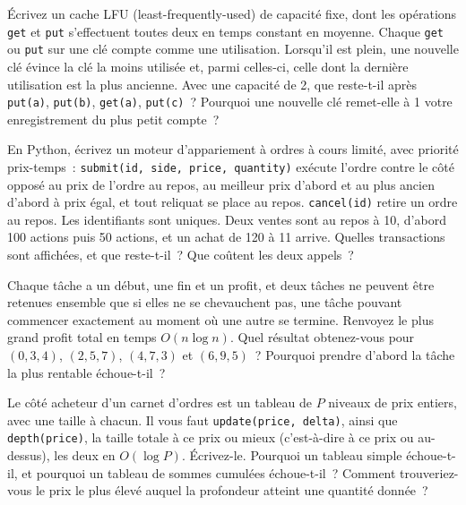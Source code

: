 \begin{question}\label{iq:iv3:algorithms:56}
Écrivez un cache LFU (least-frequently-used) de capacité fixe, dont les opérations \texttt{get} et \texttt{put} s'effectuent toutes deux en temps constant en moyenne. Chaque \texttt{get} ou \texttt{put} sur une clé compte comme une utilisation. Lorsqu'il est plein, une nouvelle clé évince la clé la moins utilisée et, parmi celles-ci, celle dont la dernière utilisation est la plus ancienne. Avec une capacité de 2, que reste-t-il après \texttt{put(a)}, \texttt{put(b)}, \texttt{get(a)}, \texttt{put(c)}~? Pourquoi une nouvelle clé remet-elle à 1 votre enregistrement du plus petit compte~?
\end{question}

\begin{question}\label{iq:iv3:algorithms:57}
En Python, écrivez un moteur d'appariement à ordres à cours limité, avec priorité prix-temps~: \texttt{submit(id, side, price, quantity)} exécute l'ordre contre le côté opposé au prix de l'ordre au repos, au meilleur prix d'abord et au plus ancien d'abord à prix égal, et tout reliquat se place au repos. \texttt{cancel(id)} retire un ordre au repos. Les identifiants sont uniques. Deux ventes sont au repos à 10, d'abord 100 actions puis 50 actions, et un achat de 120 à 11 arrive. Quelles transactions sont affichées, et que reste-t-il~? Que coûtent les deux appels~?
\end{question}

\begin{question}\label{iq:iv3:algorithms:58}
Chaque tâche a un début, une fin et un profit, et deux tâches ne peuvent être retenues ensemble que si elles ne se chevauchent pas, une tâche pouvant commencer exactement au moment où une autre se termine. Renvoyez le plus grand profit total en temps $O(n \log n)$. Quel résultat obtenez-vous pour $(0, 3, 4)$, $(2, 5, 7)$, $(4, 7, 3)$ et $(6, 9, 5)$~? Pourquoi prendre d'abord la tâche la plus rentable échoue-t-il~?
\end{question}

\begin{question}\label{iq:iv3:algorithms:59}
Le côté acheteur d'un carnet d'ordres est un tableau de $P$ niveaux de prix entiers, avec une taille à chacun. Il vous faut \texttt{update(price, delta)}, ainsi que \texttt{depth(price)}, la taille totale à ce prix ou mieux (c'est-à-dire à ce prix ou au-dessus), les deux en $O(\log P)$. Écrivez-le. Pourquoi un tableau simple échoue-t-il, et pourquoi un tableau de sommes cumulées échoue-t-il~? Comment trouveriez-vous le prix le plus élevé auquel la profondeur atteint une quantité donnée~?
\end{question}

